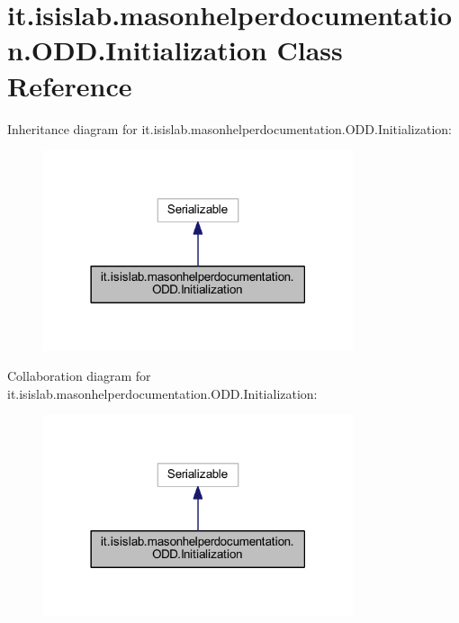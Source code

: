 \hypertarget{classit_1_1isislab_1_1masonhelperdocumentation_1_1_o_d_d_1_1_initialization}{\section{it.\-isislab.\-masonhelperdocumentation.\-O\-D\-D.\-Initialization Class Reference}
\label{classit_1_1isislab_1_1masonhelperdocumentation_1_1_o_d_d_1_1_initialization}
}


Inheritance diagram for it.\-isislab.\-masonhelperdocumentation.\-O\-D\-D.\-Initialization\-:\nopagebreak
\begin{figure}[H]
\begin{center}
\leavevmode
\includegraphics[width=258pt]{classit_1_1isislab_1_1masonhelperdocumentation_1_1_o_d_d_1_1_initialization__inherit__graph}
\end{center}
\end{figure}


Collaboration diagram for it.\-isislab.\-masonhelperdocumentation.\-O\-D\-D.\-Initialization\-:\nopagebreak
\begin{figure}[H]
\begin{center}
\leavevmode
\includegraphics[width=258pt]{classit_1_1isislab_1_1masonhelperdocumentation_1_1_o_d_d_1_1_initialization__coll__graph}
\end{center}
\end{figure}
